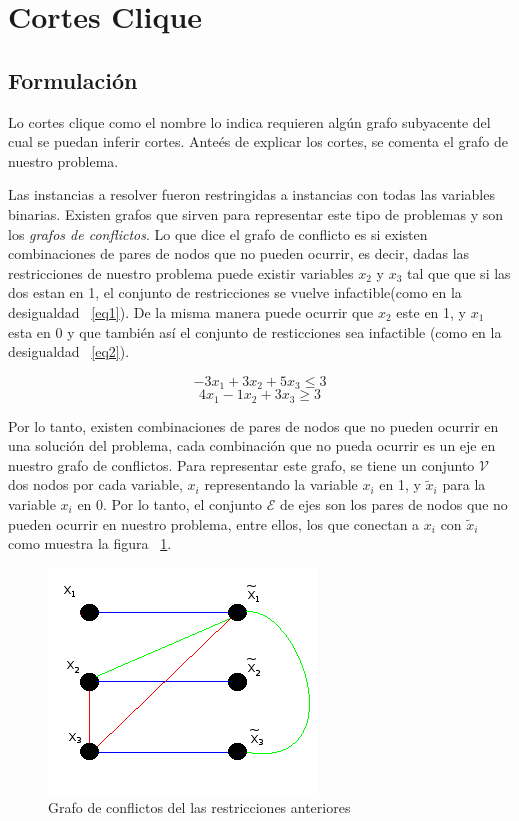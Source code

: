 \section{Cortes Clique}

\bigskip
\subsection{Formulaci\'on}
\label{formulacion}

Lo cortes clique como el nombre lo indica requieren alg\'un grafo subyacente del cual se puedan inferir cortes.
Ante\'es de explicar los cortes, se comenta el grafo de nuestro problema.

Las instancias a resolver fueron restringidas a instancias con todas las variables binarias.
Existen grafos que sirven para representar este tipo de problemas y son los \emph{grafos de conflictos}.
Lo que dice el grafo de conflicto es si existen combinaciones de pares de nodos que no pueden ocurrir, es decir,
dadas las restricciones de nuestro problema puede existir variables $x_2$ y $x_3$ tal que que si las dos estan en 1,
el conjunto de restricciones se vuelve infactible(como en la desigualdad ~\ref{eq1}). De la misma manera puede ocurrir que $x_2$ este en 1, y $x_1$ esta en 0 y que tambi\'en
as\'i el conjunto de resticciones sea infactible (como en la desigualdad ~\ref{eq2}).

\begin{equation} \label{eq1}
-3 x_1 + 3 x_2 + 5 x_3 \leq 3
\end{equation}
\begin{equation} \label{eq2}
4 x_1 - 1 x_2 + 3 x_3 \geq 3
\end{equation}

Por lo tanto, existen combinaciones de pares de nodos que no pueden ocurrir en una soluci\'on del problema, cada combinaci\'on que no pueda ocurrir
es un eje en nuestro grafo de conflictos. Para representar este grafo, se tiene un conjunto $\mathcal{V}$ dos nodos por cada variable, $x_i$
representando la variable $x_i$ en 1, y $\tilde{x}_i$ para la variable $x_i$ en 0. Por lo tanto, el conjunto $\mathcal{E}$ de ejes son los pares de 
nodos que no pueden ocurrir en nuestro problema, entre ellos, los que conectan a $x_i$ con $\tilde{x}_i$ como muestra la figura ~\ref{fig1}.


\begin{figure}[H]
\begin{center}
\includegraphics{grafoconflicto}
\end{center}
\caption{Grafo de conflictos del las restricciones anteriores}
\label{fig1}
\end{figure}


